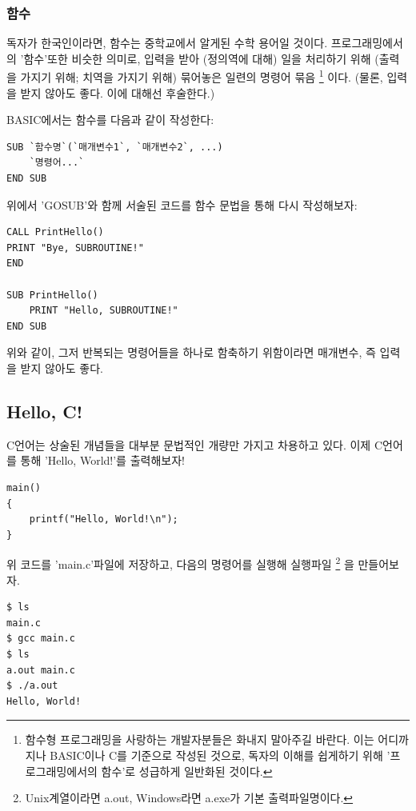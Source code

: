 \documentclass{article}
\begin{document}
\subsubsection{함수}

독자가 한국인이라면, 함수는 중학교에서 알게된 수학 용어일 것이다.
프로그래밍에서의 '함수'또한 비슷한 의미로,
입력을 받아 (정의역에 대해) 일을 처리하기 위해 (출력을 가지기 위해; 치역을 가지기 위해)
묶어놓은 일련의 명령어 묶음
\footnote{
    함수형 프로그래밍을 사랑하는 개발자분들은 화내지 말아주길 바란다.
    이는 어디까지나 BASIC이나 C를 기준으로 작성된 것으로,
    독자의 이해를 쉽게하기 위해 '프로그래밍에서의 함수'로 성급하게 일반화된 것이다.
}
이다. (물론, 입력을 받지 않아도 좋다. 이에 대해선 후술한다.)

BASIC에서는 함수를 다음과 같이 작성한다:

\begin{lstlisting}[escapeinside=``]
SUB `함수명`(`매개변수1`, `매개변수2`, ...)
    `명령어...`
END SUB
\end{lstlisting}

위에서 'GOSUB'와 함께 서술된 코드를 함수 문법을 통해 다시 작성해보자:

\begin{lstlisting}
CALL PrintHello()
PRINT "Bye, SUBROUTINE!"
END

SUB PrintHello()
    PRINT "Hello, SUBROUTINE!"
END SUB
\end{lstlisting}

위와 같이, 그저 반복되는 명령어들을 하나로 함축하기 위함이라면 매개변수,
즉 입력을 받지 않아도 좋다.

\subsection{Hello, C!}

C언어는 상술된 개념들을 대부분 문법적인 개량만 가지고 차용하고 있다.
이제 C언어를 통해 'Hello, World!'를 출력해보자!


\begin{lstlisting}
main()
{
    printf("Hello, World!\n");
}
\end{lstlisting}

위 코드를 'main.c'파일에 저장하고, 다음의 명령어를 실행해 실행파일
\footnote{
    Unix계열이라면 a.out, Windows라면 a.exe가 기본 출력파일명이다.
}
을 만들어보자.

\begin{lstlisting}[language=bash]
$ ls
main.c
$ gcc main.c
$ ls
a.out main.c
$ ./a.out
Hello, World!
\end{lstlisting}
\end{document}
